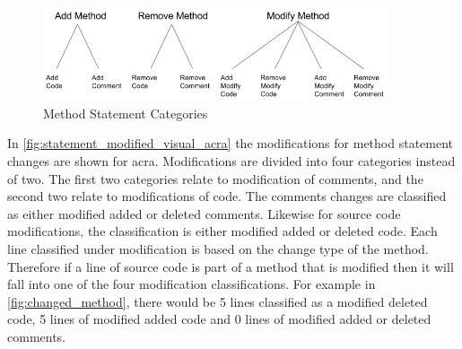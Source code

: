 \begin{figure}
 \centering
    \includegraphics[width=0.9\textwidth]{images/method_classification}
    \caption{Method Statement Categories}
    \label{fig:method_statement_categories}
\end{figure}

In \autoref{fig:statement_modified_visual_acra} the modifications for method statement changes are shown for acra. Modifications are divided into four categories instead of two. The first two categories relate to modification of comments, and the second two relate to modifications of code. The comments changes are classified as either modified added or deleted comments. Likewise for source code modifications, the classification is either modified added or deleted code. Each line classified under modification is based on the change type of the method. Therefore if a line of source code is part of a method that is modified then it will fall into one of the four modification classifications. For example in \autoref{fig:changed_method}, there would be 5 lines classified as a modified deleted code, 5 lines of modified added code and 0 lines of modified added or deleted comments.



